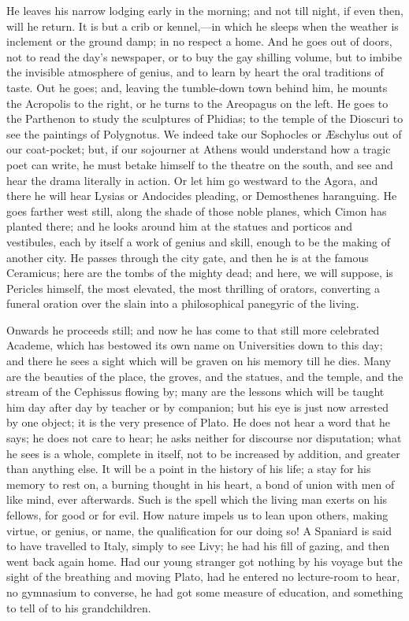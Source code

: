 He leaves his narrow lodging early in the morning; and not till
night, if even then, will he return. It is but a crib or kennel,—in
which he sleeps when the weather is inclement or the ground damp; in
no respect a home. And he goes out of doors, not to read the day's
newspaper, or to buy the gay shilling volume, but to imbibe the
invisible atmosphere of genius, and to learn by heart the oral
traditions of taste. Out he goes; and, leaving the tumble-down town
behind him, he mounts the Acropolis to the right, or he turns to the
Areopagus on the left. He goes to the Parthenon to study the
sculptures of Phidias; to the temple of the Dioscuri to see the
paintings of Polygnotus. We indeed take our Sophocles or Æschylus out
of our coat-pocket; but, if our sojourner at Athens would understand
how a tragic poet can write, he must betake himself to the theatre on
the south, and see and hear the drama literally in action. Or let him
go westward to the Agora, and there he will hear Lysias or Andocides
pleading, or Demosthenes haranguing. He goes farther west still, along
the shade of those noble planes, which Cimon has planted there; and he
looks around him at the statues and porticos and vestibules, each by
itself a work of genius and skill, enough to be the making of another
city. He passes through the city gate, and then he is at the famous
Ceramicus; here are the tombs of the mighty dead; and here, we will
suppose, is Pericles himself, the most elevated, the most thrilling of
orators, converting a funeral oration over the slain into a
philosophical panegyric of the living.

Onwards he proceeds still; and now he has come to that still more
celebrated Academe, which has bestowed its own name on Universities
down to this day; and there he sees a sight which will be graven on
his memory till he dies. Many are the beauties of the place, the
groves, and the statues, and the temple, and the stream of the
Cephissus flowing by; many are the lessons which will be taught him
day after day by teacher or by companion; but his eye is just now
arrested by one object; it is the very presence of Plato. He does not
hear a word that he says; he does not care to hear; he asks neither
for discourse nor disputation; what he sees is a whole, complete in
itself, not to be increased by addition, and greater than anything
else. It will be a point in the history of his life; a stay for
his memory to rest on, a burning thought in his heart, a bond of union
with men of like mind, ever afterwards. Such is the spell which the
living man exerts on his fellows, for good or for evil. How nature
impels us to lean upon others, making virtue, or genius, or name, the
qualification for our doing so! A Spaniard is said to have travelled
to Italy, simply to see Livy; he had his fill of gazing, and then went
back again home. Had our young stranger got nothing by his voyage but
the sight of the breathing and moving Plato, had he entered no
lecture-room to hear, no gymnasium to converse, he had got some
measure of education, and something to tell of to his grandchildren.

